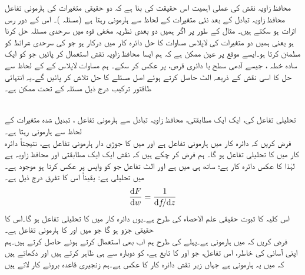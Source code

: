 محافظ زاویہ نقش کی عملی اہمیت اس حقیقت کی بنا ہے کہ دو حقیقی متغیرات کی ہارمونی تفاعل محافظ زاویہ تبادل کے بعد نئی متغیرات کے لحاظ سے ہارمونی رہتا ہے (مسئلہ )۔ اس کے دور رس اثرات  ہو سکتے ہیں۔ مثال کے طور پر اگر ہمیں دو بعدی نظریہ مخفی قوہ میں سرحدی مسئلہ حل کرنا ہو یعنی ہمیں دو متغیرات کی لاپلاس مساوات کا حل دائرہ کار  میں درکار ہو جو  کی سرحدی شرائط کو مطمئن کرتا ہو۔ایسے موقع پر عین ممکن ہے کہ ہم ایسا محافظ زاویہ نقش استعمال کر پائیں جو  کو ایک سادہ خطہ ، جیسے آدھی سطح یا دائری قرص، پر عکس کر سکے۔ ہم مساوات لاپلاس کے  کے لحاظ سے حل کا اسی نقش کے ذریعہ الٹ حاصل کرتے ہوئے اصل مسئلے کا حل تلاش کر پائیں گے۔یہ انتہائی طاقتور ترکیب درج ذیل مسئلہ کے تحت ممکن ہے۔

\quad {}\\
تحلیلی تفاعل  کی، ایک ایک مطابقتی، محافظ زاویہ تبادل  سے  ہارمونی تفاعل ،  تبدیل شدہ متغیرات کے لحاظ سے ہارمونی رہتا ہے۔ 
\quad {}\\
فرض کریں کہ دائرہ کار  میں ہارمونی تفاعل  ہے  اور  میں  کا جوڑی دار ہارمونی تفاعل  ہے، نتیجتاً  دائرہ کار  میں  کا تحلیلی تفاعل  ہو گا۔ ہم فرض کر چکے ہیں کہ نقش  ایک ایک مطابقتی اور محافظ زاویہ ہے لہٰذا  کا عکس  دائرہ کار ہے؛ ساتھ ہی  میں  ہے اور الٹ تفاعل  جو  کو واپس  پر عکس کرتا ہو موجود ہے۔ میں  تحلیلی ہے: یقیناً اس کا  تفرق درج ذیل ہے۔
\begin{align*}
\frac{\dif F}{\dif w}=\frac{1}{\dif f\!/\!\dif z}
\end{align*}
اس کلیہ کا ثبوت حقیقی علم الاحصاء کی طرح ہے۔یوں  دائرہ کار  میں  کا تحلیلی تفاعل ہو گا۔اس کا حقیقی جزو  ہو گا جو  میں  اور  کا ہارمونی تفاعل ہے۔ 
\quad {}\\
فرض کریں کہ  میں  ہارمونی ہے۔پہلے کی طرح ہم اب بھی  استعمال کرتے  ہوئے  حاصل کرتے ہیں۔ہم اپنی  آسانی کی خاطر، اس تفاعل، جو  اور  کا تابع ہے، کو دوبارہ  سے ہی ظاہر کرتے ہیں اور دکھاتے ہیں کہ  میں یہ ہارمونی ہے جہاں   زیر نقش  دائرہ کار  کا عکس ہے۔ہم زنجیری قاعدہ بروئے کار لاتے ہیں
